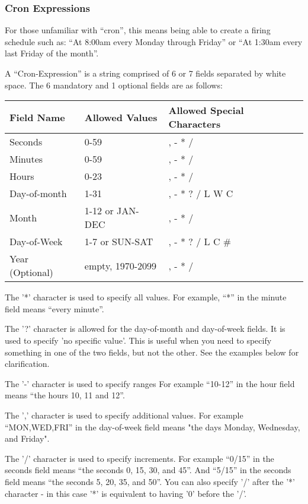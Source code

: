 \documentclass{InsightBook}
\begin{document}
\subsubsection{Cron Expressions}
 For those unfamiliar with ``cron'', this means being able to create a firing schedule such as: ``At 8:00am every Monday through Friday'' or ``At 1:30am every last Friday of the month''.

A ``Cron-Expression'' is a string comprised of 6 or 7 fields separated
by white space. The 6 mandatory and 1 optional fields are as follows:

\begin{tabular}{lll}
Field Name &            Allowed Values &                Allowed Special Characters \\
\hline
Seconds &               0-59 &          , - * /   \\ 
Minutes&                0-59&           , - * / \\
Hours&          0-23&           , - * / \\
Day-of-month&           1-31&           , - * ? / L W C \\
Month&          1-12 or JAN-DEC&                , - * / \\
Day-of-Week&            1-7 or SUN-SAT&                 , - * ? / L C \# \\
Year (Optional)&                empty, 1970-2099&               , - * / \\
\end{tabular}

The '*' character is used to specify all values. For example, ``*'' in
the minute field means ``every minute''.

The '?' character is allowed for the day-of-month and day-of-week
fields. It is used to specify 'no specific value'. This is useful when
you need to specify something in one of the two fields, but not the
other. See the examples below for clarification.

The '-' character is used to specify ranges For example ``10-12'' in the
hour field means ``the hours 10, 11 and 12''.

The ',' character is used to specify additional values. For example
``MON,WED,FRI'' in the day-of-week field means "the days Monday,
Wednesday, and Friday".

The '/' character is used to specify increments. For example ``0/15'' in
the seconds field means ``the seconds 0, 15, 30, and 45''. And ``5/15'' in
the seconds field means ``the seconds 5, 20, 35, and 50''. You can also
specify '/' after the '*' character - in this case '*' is equivalent
to having '0' before the '/'.
\end{document}
